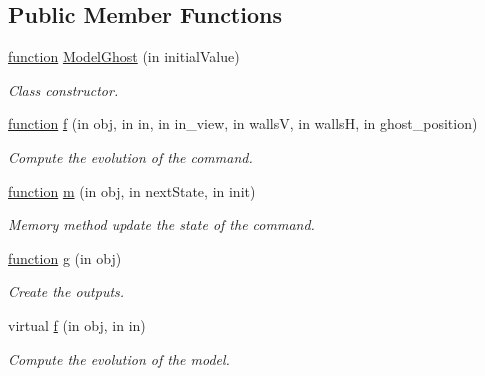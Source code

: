 \subsection*{Public Member Functions}
\begin{DoxyCompactItemize}
\item 
\hyperlink{_plan__desuma_functions__2_players_8m_ac2ffb26d6f42d3bbcd7847b0873403f4}{function} \hyperlink{class_model_ghost_a0eb9a8f9771bba8a091d35339af59343}{Model\+Ghost} (in initial\+Value)
\begin{DoxyCompactList}\small\item\em Class constructor. \end{DoxyCompactList}\item 
\hyperlink{_plan__desuma_functions__2_players_8m_ac2ffb26d6f42d3bbcd7847b0873403f4}{function} \hyperlink{class_model_ghost_a3643512eacb95c58d0678b6a76176101}{f} (in obj, in in, in in\+\_\+view, in wallsV, in wallsH, in ghost\+\_\+position)
\begin{DoxyCompactList}\small\item\em Compute the evolution of the command. \end{DoxyCompactList}\item 
\hyperlink{_plan__desuma_functions__2_players_8m_ac2ffb26d6f42d3bbcd7847b0873403f4}{function} \hyperlink{class_model_ghost_a3140f24c6c4b80037b7d4f521c6ae2d3}{m} (in obj, in next\+State, in init)
\begin{DoxyCompactList}\small\item\em Memory method update the state of the command. \end{DoxyCompactList}\item 
\hyperlink{_plan__desuma_functions__2_players_8m_ac2ffb26d6f42d3bbcd7847b0873403f4}{function} \hyperlink{class_model_ghost_a07dadfabe92bf9a144b8a862720e7746}{g} (in obj)
\begin{DoxyCompactList}\small\item\em Create the outputs. \end{DoxyCompactList}\item 
virtual \hyperlink{class_model_s_e_d_ac36f9451c43b120828af4380858f2024}{f} (in obj, in in)
\begin{DoxyCompactList}\small\item\em Compute the evolution of the model. \end{DoxyCompactList}\end{DoxyCompactItemize}
